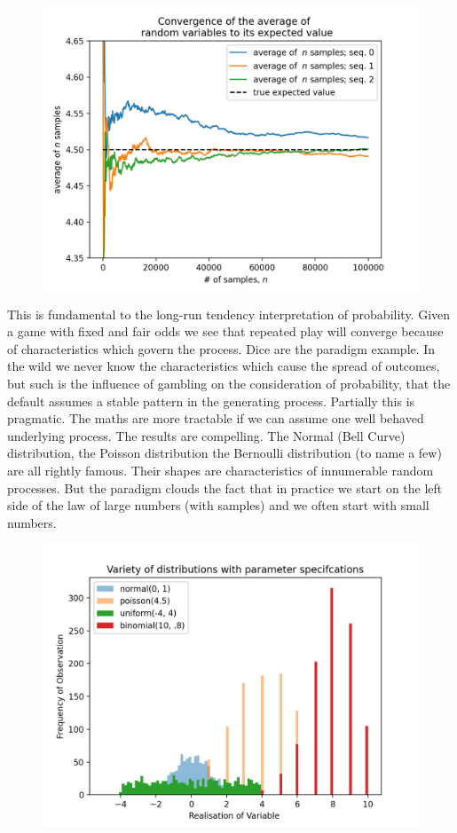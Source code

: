 \documentclass[10pt,a4paper,notitlepage, twocolumn]{article}
\begin{document}
\begin{figure}[H]
  \includegraphics[width=\linewidth]{./Plots/convergence_of_law_of_large_numbers.png}
\end{figure}
\noindent  This is fundamental to the long-run tendency interpretation of probability. Given a game with fixed and fair odds we see that repeated play will converge because of characteristics which govern the process. Dice are the paradigm example.  In the wild we never know the characteristics which cause the spread of outcomes, but such is the influence of gambling on the consideration of probability, that the default assumes a stable pattern in the generating process. Partially this is pragmatic. The maths are more tractable if we can assume one well behaved underlying process. The results are compelling. The Normal (Bell Curve) distribution, the Poisson distribution the Bernoulli distribution (to name a few) are all rightly famous. Their shapes are characteristics of innumerable random processes. But the paradigm clouds the fact that in practice we start on the left side of the law of large numbers (with samples) and we often start with small numbers. 
\begin{figure}[H]
  \includegraphics[width=\linewidth]{./Plots/variety_of_distributions.png}
\end{figure}
\end{document}
